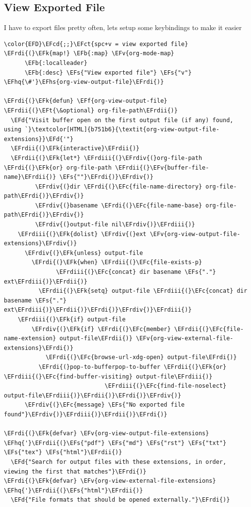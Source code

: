\documentclass{scrartcl}
\newcommand{\EFk}[1]{\textcolor{EFk}{#1}} %
\newcommand{\EFd}[1]{\textcolor{EFd}{\textit{#1}}} %
\newcommand{\EFt}[1]{\textcolor{EFt}{#1}} %
\newcommand{\EFs}[1]{\textcolor{EFs}{#1}} %
\newcommand{\EFb}[1]{\textcolor{EFb}{#1}} %
\newcommand{\EFct}[1]{\textcolor{EFct}{#1}} %
\newcommand{\EFc}[1]{\textcolor{EFc}{#1}} %
\newcommand{\EFv}[1]{\textcolor{EFv}{#1}} %
\newcommand{\EFf}[1]{\textcolor{EFf}{#1}} %
\newcommand{\EFcd}[1]{\textcolor{EFcd}{#1}} %
\newcommand{\EFhq}[1]{\textcolor{EFhq}{#1}} %
\newcommand{\EFhs}[1]{\textcolor{EFhs}{#1}} %
\newcommand{\EFrdi}[1]{\textcolor{EFrdi}{#1}} %
\newcommand{\EFrdii}[1]{\textcolor{EFrdii}{#1}} %
\newcommand{\EFrdiii}[1]{\textcolor{EFrdiii}{#1}} %
\newcommand{\EFrdiv}[1]{\textcolor{EFrdiv}{#1}} %
\begin{document}
\subsection{View Exported File}
\label{sec:org5f702b8}
I have to export files pretty often, lets setup some keybindings to make it easier
\begin{Code}
\begin{Verbatim}[]
\color{EFD}\EFcd{;;}\EFct{spc+v = view exported file}
\EFrdi{(}\EFk{map!} \EFb{:map} \EFv{org-mode-map}
      \EFb{:localleader}
      \EFb{:desc} \EFs{"View exported file"} \EFs{"v"} \EFhq{\#'}\EFhs{org-view-output-file}\EFrdi{)}

\EFrdi{(}\EFk{defun} \EFf{org-view-output-file} \EFrdii{(}\EFt{\&optional} org-file-path\EFrdii{)}
  \EFd{"Visit buffer open on the first output file (if any) found, using `}\textcolor[HTML]{b751b6}{\textit{org-view-output-file-extensions}}\EFd{'"}
  \EFrdii{(}\EFk{interactive}\EFrdii{)}
  \EFrdii{(}\EFk{let*} \EFrdiii{(}\EFrdiv{(}org-file-path \EFrdi{(}\EFk{or} org-file-path \EFrdii{(}\EFv{buffer-file-name}\EFrdii{)} \EFs{""}\EFrdi{)}\EFrdiv{)}
         \EFrdiv{(}dir \EFrdi{(}\EFc{file-name-directory} org-file-path\EFrdi{)}\EFrdiv{)}
         \EFrdiv{(}basename \EFrdi{(}\EFc{file-name-base} org-file-path\EFrdi{)}\EFrdiv{)}
         \EFrdiv{(}output-file nil\EFrdiv{)}\EFrdiii{)}
    \EFrdiii{(}\EFk{dolist} \EFrdiv{(}ext \EFv{org-view-output-file-extensions}\EFrdiv{)}
      \EFrdiv{(}\EFk{unless} output-file
        \EFrdi{(}\EFk{when} \EFrdii{(}\EFc{file-exists-p}
               \EFrdiii{(}\EFc{concat} dir basename \EFs{"."} ext\EFrdiii{)}\EFrdii{)}
          \EFrdii{(}\EFk{setq} output-file \EFrdiii{(}\EFc{concat} dir basename \EFs{"."} ext\EFrdiii{)}\EFrdii{)}\EFrdi{)}\EFrdiv{)}\EFrdiii{)}
    \EFrdiii{(}\EFk{if} output-file
        \EFrdiv{(}\EFk{if} \EFrdi{(}\EFc{member} \EFrdii{(}\EFc{file-name-extension} output-file\EFrdii{)} \EFv{org-view-external-file-extensions}\EFrdi{)}
            \EFrdi{(}\EFc{browse-url-xdg-open} output-file\EFrdi{)}
          \EFrdi{(}pop-to-bufferpop-to-buffer \EFrdii{(}\EFk{or} \EFrdiii{(}\EFc{find-buffer-visiting} output-file\EFrdiii{)}
                             \EFrdiii{(}\EFc{find-file-noselect} output-file\EFrdiii{)}\EFrdii{)}\EFrdi{)}\EFrdiv{)}
      \EFrdiv{(}\EFc{message} \EFs{"No exported file found"}\EFrdiv{)}\EFrdiii{)}\EFrdii{)}\EFrdi{)}

\EFrdi{(}\EFk{defvar} \EFv{org-view-output-file-extensions} \EFhq{'}\EFrdii{(}\EFs{"pdf"} \EFs{"md"} \EFs{"rst"} \EFs{"txt"} \EFs{"tex"} \EFs{"html"}\EFrdii{)}
  \EFd{"Search for output files with these extensions, in order, viewing the first that matches"}\EFrdi{)}
\EFrdi{(}\EFk{defvar} \EFv{org-view-external-file-extensions} \EFhq{'}\EFrdii{(}\EFs{"html"}\EFrdii{)}
  \EFd{"File formats that should be opened externally."}\EFrdi{)}
\end{Verbatim}
\end{Code}
\end{document}

